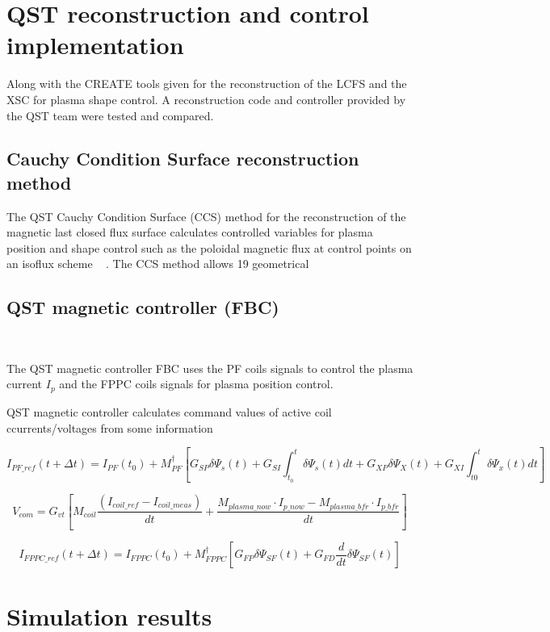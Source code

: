 \section{QST reconstruction and control implementation}

Along with the CREATE tools given for the reconstruction of the LCFS and the XSC for  plasma shape control. A reconstruction code and controller provided by the QST team were tested and compared.

\subsection{Cauchy Condition Surface reconstruction  method }
The QST Cauchy Condition Surface (CCS) method for the reconstruction of the magnetic last closed flux surface calculates controlled variables for plasma position and shape control such as the poloidal magnetic flux at control points on an isoflux scheme  ~\cite{CCS} . The CCS method allows 19 geometrical 

\subsection{QST magnetic controller (FBC)}

~\cite{FBC}

The QST magnetic controller FBC uses the PF coils signals to control the plasma current $I_p$ and the FPPC coils signals for plasma position control.

QST magnetic controller calculates command values of active coil ccurrents/voltages from some information

\begin{equation}
I_{PF\_ref}(t+\Delta t) = I_{PF}(t_0)+M^\dagger_{PF}\left[G_{SP}\delta\Psi_s(t)+G_{SI}\int_{t_0}^{t}\delta\Psi_s(t)dt+G_{XP}\delta\Psi_X(t)+G_{XI}\int_{t0}^{t}\delta\Psi_x(t)dt\right]
\end{equation}

\begin{equation}
V_{com}=G_{vt}\left[M_{coil}\frac{(I_{coil\_ref}-I_{coil\_meas})}{dt}+ \frac{M_{plasma\_now} \cdot I_{p\_now} - M_{plasma\_ bfr} \cdot I_{p\_bfr}}{dt}\right]
\end{equation}

\begin{equation}
I_{FPPC\_ref}(t+\Delta t)=I_{FPPC}(t_0)+ M^\dagger_{FPPC}\left[G_{FP}\delta \Psi_{SF}(t) + G_{FD}\frac{d}{dt}\delta\Psi_{SF}(t) \right]
\end{equation}
\section{Simulation results}	

